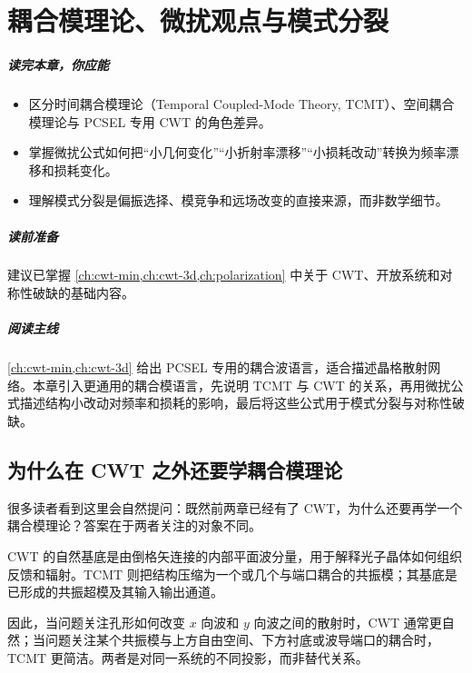 \chapter{耦合模理论、微扰观点与模式分裂}
\label{ch:cmt}

\paragraph{读完本章，你应能}
\begin{itemize}
  \item 区分时间耦合模理论（Temporal Coupled-Mode Theory, TCMT）、空间耦合模理论与 PCSEL 专用 CWT 的角色差异。
  \item 掌握微扰公式如何把“小几何变化”“小折射率漂移”“小损耗改动”转换为频率漂移和损耗变化。
  \item 理解模式分裂是偏振选择、模竞争和远场改变的直接来源，而非数学细节。
\end{itemize}

\paragraph{读前准备}
建议已掌握 \cref{ch:cwt-min,ch:cwt-3d,ch:polarization} 中关于 CWT、开放系统和对称性破缺的基础内容。

\paragraph{阅读主线}
\cref{ch:cwt-min,ch:cwt-3d} 给出 PCSEL 专用的耦合波语言，适合描述晶格散射网络。本章引入更通用的耦合模语言，先说明 TCMT 与 CWT 的关系，再用微扰公式描述结构小改动对频率和损耗的影响，最后将这些公式用于模式分裂与对称性破缺。

\section{为什么在 CWT 之外还要学耦合模理论}
很多读者看到这里会自然提问：既然前两章已经有了 CWT，为什么还要再学一个耦合模理论？答案在于两者关注的对象不同。

CWT 的自然基底是由倒格矢连接的内部平面波分量，用于解释光子晶体如何组织反馈和辐射。TCMT 则把结构压缩为一个或几个与端口耦合的共振模；其基底是已形成的共振超模及其输入输出通道。

因此，当问题关注孔形如何改变 $x$ 向波和 $y$ 向波之间的散射时，CWT 通常更自然；当问题关注某个共振模与上方自由空间、下方衬底或波导端口的耦合时，TCMT 更简洁。两者是对同一系统的不同投影，而非替代关系。

